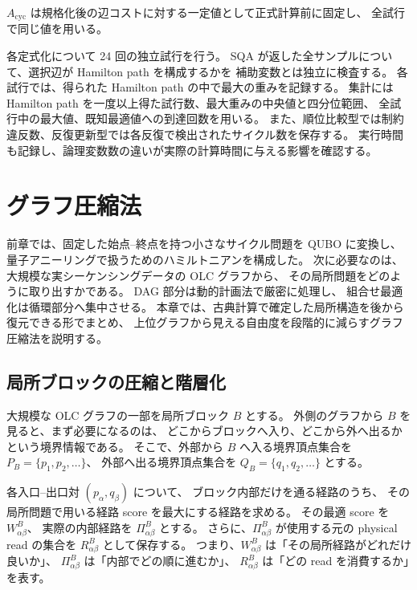 \documentclass[a4j,10pt]{ujarticle}
\begin{document}
$A_{\mathrm{cyc}}$ は規格化後の辺コストに対する一定値として正式計算前に固定し、
全試行で同じ値を用いる。

各定式化について 24 回の独立試行を行う。
SQA が返した全サンプルについて、選択辺が Hamilton path を構成するかを
補助変数とは独立に検査する。
各試行では、得られた Hamilton path の中で最大の重みを記録する。
集計には Hamilton path を一度以上得た試行数、最大重みの中央値と四分位範囲、
全試行中の最大値、既知最適値への到達回数を用いる。
また、順位比較型では制約違反数、反復更新型では各反復で検出されたサイクル数を保存する。
実行時間も記録し、論理変数数の違いが実際の計算時間に与える影響を確認する。



\section{グラフ圧縮法}

前章では、固定した始点--終点を持つ小さなサイクル問題を QUBO に変換し、
量子アニーリングで扱うためのハミルトニアンを構成した。
次に必要なのは、大規模な実シーケンシングデータの OLC グラフから、
その局所問題をどのように取り出すかである。
DAG 部分は動的計画法で厳密に処理し、
組合せ最適化は循環部分へ集中させる。
本章では、古典計算で確定した局所構造を後から復元できる形でまとめ、
上位グラフから見える自由度を段階的に減らすグラフ圧縮法を説明する。

\subsection{局所ブロックの圧縮と階層化}
\label{subsec:local_compression}

大規模な OLC グラフの一部を局所ブロック $B$ とする。
外側のグラフから $B$ を見ると、まず必要になるのは、
どこからブロックへ入り、どこから外へ出るかという境界情報である。
そこで、外部から $B$ へ入る境界頂点集合を
$P_B=\{p_1,p_2,\ldots\}$、
外部へ出る境界頂点集合を
$Q_B=\{q_1,q_2,\ldots\}$ とする。

各入口--出口対 $(p_\alpha,q_\beta)$ について、
ブロック内部だけを通る経路のうち、
その局所問題で用いる経路 score を最大にする経路を求める。
その最適 score を $W_{\alpha\beta}^{B}$、
実際の内部経路を $\Pi_{\alpha\beta}^{B}$ とする。
さらに、$\Pi_{\alpha\beta}^{B}$ が使用する元の physical read の集合を
$R_{\alpha\beta}^{B}$ として保存する。
つまり、$W_{\alpha\beta}^{B}$ は「その局所経路がどれだけ良いか」、
$\Pi_{\alpha\beta}^{B}$ は「内部でどの順に進むか」、
$R_{\alpha\beta}^{B}$ は「どの read を消費するか」を表す。
\end{document}

